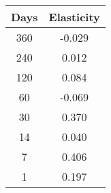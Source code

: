 \begin{tabular}{||c c||}
\hline
Days & Elasticity \\
\hline\hline
360 & -0.029 \\
240 & 0.012 \\
120 & 0.084 \\
60 & -0.069 \\
30 & 0.370 \\
14 & 0.040 \\
7 & 0.406 \\
1 & 0.197 \\
\hline
\end{tabular}
